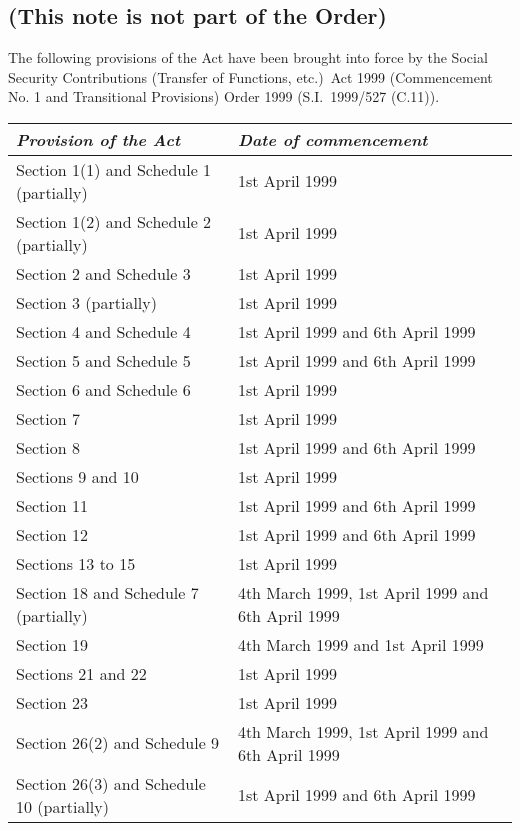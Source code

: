 \documentclass[12pt,a4paper]{article}
\begin{document}
\renewcommand\parthead{— Note as to Earlier Commencement Orders}

\subsection*{(This note is not part of the Order)}

The following provisions of the Act have been brought into force by the Social Security Contributions (Transfer of Functions, etc.)\ Act 1999 (Commencement No. 1 and Transitional Provisions) Order 1999 (S.I.\ 1999/527 (C.11)).

{\footnotesize

\noindent
\begin{longtable}{p{163.83409pt}p{202.16959pt}}
\hline
\itshape Provision of the Act	& \itshape Date of commencement\\
\hline
\endhead
\hline
\endlastfoot
Section 1(1) and Schedule 1 (partially)	&1st April 1999\\
Section 1(2) and Schedule 2 (partially)	&1st April 1999\\
Section 2 and Schedule 3	&1st April 1999\\
Section 3 (partially)	&1st April 1999\\
Section 4 and Schedule 4	&1st April 1999 and 6th April 1999\\
Section 5 and Schedule 5	&1st April 1999 and 6th April 1999\\
Section 6 and Schedule 6	&1st April 1999\\
Section 7	&1st April 1999\\
Section 8	&1st April 1999 and 6th April 1999\\
Sections 9 and 10	&1st April 1999\\
Section 11	&1st April 1999 and 6th April 1999\\
Section 12	&1st April 1999 and 6th April 1999\\
Sections 13 to 15	&1st April 1999\\
Section 18 and Schedule 7 (partially)	&4th March 1999, 1st April 1999 and 6th April 1999\\
Section 19	&4th March 1999 and 1st April 1999\\
Sections 21 and 22&	1st April 1999\\
Section 23	&1st April 1999\\
Section 26(2) and Schedule 9	&4th March 1999, 1st April 1999 and 6th April 1999\\
Section 26(3) and Schedule 10 (partially)	&1st April 1999 and 6th April 1999\\
\end{longtable}

}
\end{document}
